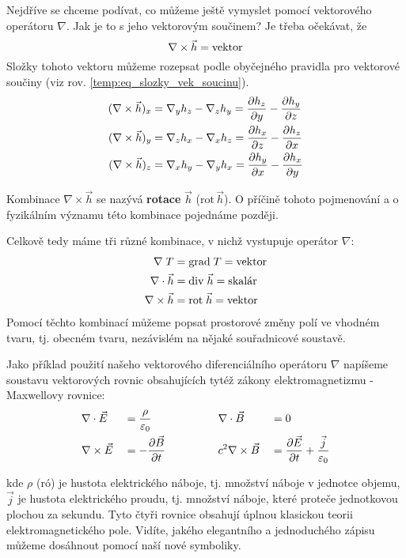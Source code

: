       Nejdříve se chceme podívat, co můžeme ještě vymyslet pomocí vektorového operátoru $\nabla$. Jak je to 
      s jeho vektorovým součinem? Je třeba očekávat, že
      \begin{equation}\label{temp:_eq_nabla_vekt_s_h}
        \nabla\times\vec{h} = \text{vektor}
      \end{equation}
      Složky tohoto vektoru můžeme rozepsat podle obyčejného pravidla pro vektorové součiny (viz rov. 
      \ref{temp:eq_slozky_vek_soucinu}).
      \begin{align}
        (\nabla\times\vec{h})_x &= \nabla_yh_z-\nabla_zh_y = \frac{\partial h_z}{\partial y} - \frac{\partial h_y}{\partial z}\\
        (\nabla\times\vec{h})_y &= \nabla_zh_x-\nabla_xh_z = \frac{\partial h_x}{\partial z} - \frac{\partial h_z}{\partial x}\\
        (\nabla\times\vec{h})_z &= \nabla_xh_y-\nabla_yh_x = \frac{\partial h_y}{\partial x} - \frac{\partial h_x}{\partial y}
      \end{align}

      Kombinace $\nabla\times\vec{h}$ se nazývá \textbf{rotace} $\vec{h}$ ($\mathrm{rot}\,\vec{h}$). O 
      příčině tohoto pojmenování a o fyzikálním významu této kombinace pojednáme později.

      Celkově tedy máme tři různé kombinace, v nichž vystupuje operátor $\nabla$:
      \begin{align*}
        \nabla\;T  &=\mathrm{grad\;}T   = \text{vektor}    \\  
        \nabla\cdot\vec{h} &=\mathrm{div}\;\vec{h}  = \text{skalár}    \\
        \nabla\times\vec{h}   &=\mathrm{rot}\;\vec{h}    = \text{vektor}
      \end{align*}
      Pomocí těchto kombinací můžeme popsat prostorové změny polí ve vhodném tvaru, tj. obecném tvaru, 
      nezávislém na nějaké souřadnicové soustavě.

      Jako příklad použití našeho vektorového diferenciálního operátoru $\nabla$ napíšeme soustavu
      vektorových rovnic obsahujících tytéž zákony elektromagnetizmu - Maxwellovy rovnice:
      \begin{alignat*}{4}
        & \nabla\cdot\vec{E}  && = \frac{\rho}{\varepsilon_0} \hspace{5em} && \nabla\cdot\vec{B}  &&=  0     \\
        & \nabla\times\vec{E}    && = -\frac{\partial \vec{B}}{\partial t}         &&c^2\nabla\times\vec{B}    &&= 
          \frac{\partial \vec{E}}{\partial t} + \frac{\vec{j}}{\varepsilon_0}
      \end{alignat*}

      kde $\rho$ (ró) je hustota elektrického náboje, tj. množství náboje v jednotce objemu, $\vec{j}$ je 
      hustota elektrického proudu, tj. množství náboje, které proteče jednotkovou plochou za sekundu. Tyto 
      čtyři rovnice obsahují úplnou klasickou teorii elektromagnetického pole. Vidíte, jakého elegantního a 
      jednoduchého zápisu můžeme dosáhnout pomocí naší nové symboliky.
      
